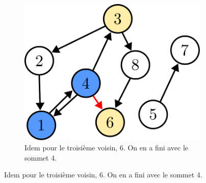 \documentclass{article}
\begin{document}
\begin{itemize}
\begin{figure}[b]
\begin{subfigure}[t]{0.3\linewidth}
			\includegraphics[width=0.9\linewidth]{../figures/bfs6.pdf}
			\caption{Idem pour le troisième voisin, 6. On en a fini avec le sommet 4.}
		\end{subfigure}
	

\end{figure}
\end{itemize}
\end{document}
